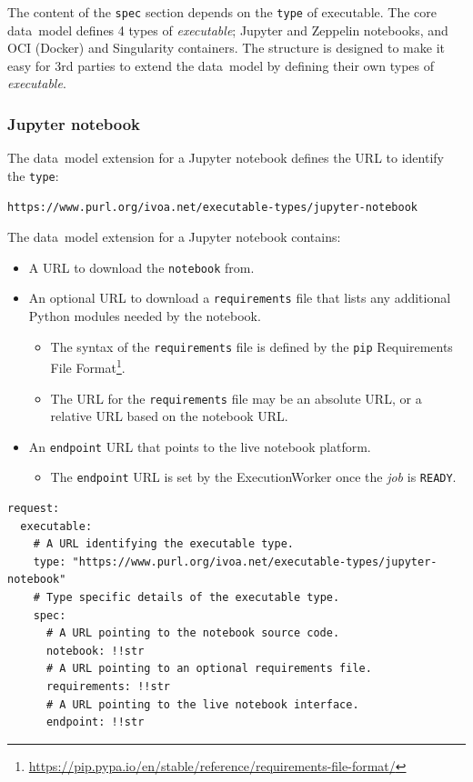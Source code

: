 \documentclass[11pt,a4paper]{ivoa}
\newcommand{\datamodel} {data~model}
\newcommand{\execworkerclass} {ExecutionWorker}
\newcommand{\jupyter} {Jupyter}
\newcommand{\jupyternotebook} {Jupyter notebook}
\newcommand{\python} {Python}
\newcommand{\zeppelin} {Zeppelin}
\newcommand{\singularity} {Singularity}
\newcommand{\codeword}[1] {\texttt{#1}}
\newcommand{\footurl}[1] {\footnote{\url{#1}}}
\newcommand{\executable} {\textit{executable}}
\newcommand{\job} {\textit{job}}
\begin{document}
The content of the \codeword{spec} section depends on the \codeword{type} of executable.
The core \datamodel{} defines 4 types of \executable{};
\jupyter{} and \zeppelin{} notebooks, and OCI (Docker) and \singularity{} containers.
The structure is designed to make it easy for 3rd parties to extend the \datamodel{}
by defining their own types of \executable{}.

\subsubsection{Jupyter notebook}
\label{datamodel-jupyter-notebook}

The \datamodel{} extension for a \jupyternotebook{} defines the URL
to identify the \codeword{type}:
\begin{lstlisting}[]
https://www.purl.org/ivoa.net/executable-types/jupyter-notebook
\end{lstlisting}
\hfill \break
The \datamodel{} extension for a \jupyternotebook{} contains:
\begin{itemize}
    \item A URL to download the \codeword{notebook} from.
    \item An optional URL to download a \codeword{requirements} file that lists any additional
    \python{} modules needed by the notebook.
    \begin{itemize}
        \item The syntax of the \codeword{requirements} file is defined by the \codeword{pip}
        Requirements File Format\footurl{https://pip.pypa.io/en/stable/reference/requirements-file-format/}.
        \item The URL for the \codeword{requirements} file may be an absolute URL, or a relative URL based on the notebook URL.
    \end{itemize}
    \item An \codeword{endpoint} URL that points to the live notebook platform.
    \begin{itemize}
        \item The \codeword{endpoint} URL is set by the \execworkerclass{} once the \job{} is \codeword{READY}.
    \end{itemize}
\end{itemize}

\begin{lstlisting}[]
request:
  executable:
    # A URL identifying the executable type.
    type: "https://www.purl.org/ivoa.net/executable-types/jupyter-notebook"
    # Type specific details of the executable type.
    spec:
      # A URL pointing to the notebook source code.
      notebook: !!str
      # A URL pointing to an optional requirements file.
      requirements: !!str
      # A URL pointing to the live notebook interface.
      endpoint: !!str
\end{lstlisting}
\end{document}
